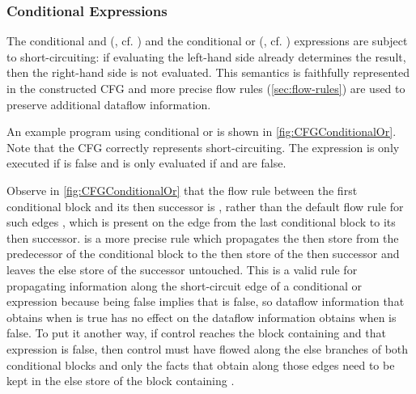 
\subsubsection{Conditional Expressions}
\label{sec:cond-exp}

The conditional and (\code{&&}, cf. ) and the
conditional or (\code{||}, cf. ) expressions are subject
to short-circuiting: if evaluating the left-hand side already
determines the result, then the right-hand side is not evaluated. This
semantics is faithfully represented in the constructed CFG and more
precise flow rules (\autoref{sec:flow-rules}) are used to preserve
additional dataflow information.

An example program using conditional or is shown in
\autoref{fig:CFGConditionalOr}.  Note that the CFG correctly
represents short-circuiting.  The expression  is only
executed if  is false and  is only evaluated if
 and  are false.

Observe in \autoref{fig:CFGConditionalOr} that the flow rule between
the first conditional block and its then successor is
, rather than the default flow rule for such edges
, which is present on the edge from the last
conditional block to its then successor.   is a
more precise rule which propagates the then store from the predecessor
of the conditional block to the then store of the then successor and
leaves the else store of the successor untouched.  This is a valid
rule for propagating information along the short-circuit edge of a
conditional or expression because  being false
implies that  is false, so dataflow information that obtains
when  is true has no effect on the dataflow information
obtains when  is false.  To put it another way,
if control reaches the block containing  and
that expression is false, then control must have flowed along the else
branches of both conditional blocks and only the facts that obtain
along those edges need to be kept in the else store of the block
containing .



